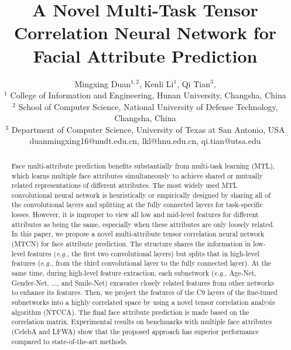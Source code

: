 \documentclass{sig-alternate-05-2015}
\begin{document}








\title{A Novel Multi-Task Tensor Correlation Neural Network for Facial Attribute Prediction }








\author{
Mingxing Duan$^{1, 2}$,
Kenli Li$^1$,
Qi Tian$^3$,
\\
$^1$ College of Information and Engineering, Hunan University, Changsha, China \\
$^2$ School of Computer Science, National University of Defense Technology, Changsha, China\\
$^3$ Department of Computer Science, University of Texas at San Antonio, USA  \\
duanmingxing16@nudt.edu.cn,
lkl@hnu.edu.cn,
qi.tian@utsa.edu
}



\maketitle
\begin{abstract}
Face multi-attribute prediction benefits substantially from multi-task learning (MTL), which learns multiple face attributes simultaneously to achieve shared or mutually related representations of different attributes. The most widely used MTL convolutional neural network is heuristically or empirically designed by sharing all of the convolutional layers and splitting at the fully connected layers for task-specific losses. However, it is improper to view all low and mid-level features for different attributes as being the same, especially when these attributes are only loosely related. In this paper, we propose a novel multi-attribute tensor correlation neural network (MTCN) for face attribute prediction. The structure shares the information in low-level features ({\em e.g.,} the first two convolutional layers) but splits that in high-level features ({\em e.g.,} from the third convolutional layer to the fully connected layer). At the same time, during high-level feature extraction, each subnetwork ({\em e.g.,} Age-Net, Gender-Net, ..., and Smile-Net) excavates closely related features from other networks to enhance its features. Then, we project the features of the C9 layers of the fine-tuned subnetworks into a highly correlated space by using a novel tensor correlation analysis algorithm (NTCCA). The final face attribute prediction is made based on the correlation matrix. Experimental results on benchmarks with multiple face attributes (CelebA and LFWA) show that the proposed approach has superior performance compared to state-of-the-art methods.
\end{abstract}
\end{document}
